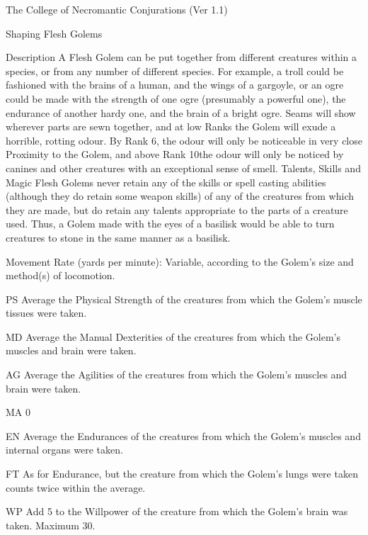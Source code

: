 \begin{Chapter}{The College of Necromantic Conjurations (Ver 1.1)}
\begin{ritual}[R-4]{Shaping Flesh Golems}
\begin{effects}
\begin{Description}
\item[Description] A Flesh Golem can be put together from different
  creatures within a species, or from any number of different
  species. For example, a troll could be fashioned with the brains of
  a human, and the wings of a gargoyle, or an ogre could be made with
  the strength of one ogre (presumably a powerful one), the endurance
  of another hardy one, and the brain of a bright ogre. Seams will
  show wherever parts are sewn together, and at low Ranks the Golem
  will exude a horrible, rotting odour. By Rank 6, the odour will only
  be noticeable in very close Proximity to the Golem, and above Rank
  10the odour will only be noticed by canines and other creatures with
  an exceptional sense of smell.  Talents, Skills and Magic Flesh
  Golems never retain any of the skills or spell casting abilities
  (although they do retain some weapon skills) of any of the creatures
  from which they are made, but do retain any talents appropriate to
  the parts of a creature used. Thus, a Golem made with the eyes of a
  basilisk would be able to turn creatures to stone in the same manner
  as a basilisk.

\item[Movement Rate] (yards per minute): Variable, according to the
  Golem’s size and method(s) of locomotion.

\item[PS] Average the Physical Strength of the creatures 
from which the Golem’s muscle tissues were taken. 

\item[MD] Average the Manual Dexterities of the creatures from which
  the Golem’s muscles and brain were taken.
  
\item[AG] Average the Agilities of the creatures from 
which the Golem’s muscles and brain were taken. 

\item[MA] 0 

\item[EN] Average the Endurances of the creatures from which the
  Golem’s muscles and internal organs were taken.

\item[FT] As for Endurance, but the creature from which the Golem’s
  lungs were taken counts twice within the average.

\item[WP] Add 5 to the Willpower of the creature from which the
  Golem’s brain was taken. Maximum 30.


\end{Description}
\end{effects}
\end{ritual}
\end{Chapter}
